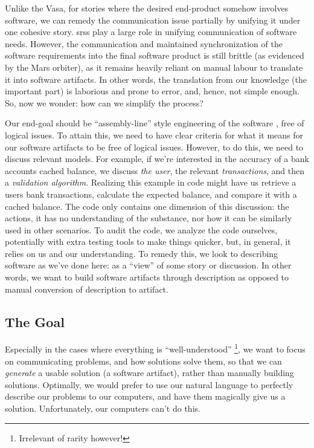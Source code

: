 Unlike the Vasa, for stories where the desired end-product somehow involves
software, we can remedy the communication issue partially by unifying it under
one cohesive story. \Aclp{srs} play a large role in unifying communication of
software needs. However, the communication and maintained synchronization of the
software requirements into the final software product is still brittle (as
evidenced by the Mars orbiter), as it remains heavily reliant on manual labour
to translate it into software artifacts. In other words, the translation from
our knowledge (the important part) is laborious and prone to error, and, hence,
not simple enough. So, now we wonder: how can we simplify the process?

Our end-goal should be ``assembly-line'' style engineering of the software
\cite{well-understood}, free of logical issues. To attain this, we need to have
clear criteria for what it means for our software artifacts to be free of
logical issues. However, to do this, we need to discuss relevant models. For
example, if we're interested in the accuracy of a bank accounts cached balance,
we discuss \textit{the user}, the relevant \textit{transactions}, and then a
\textit{validation algorithm}. Realizing this example in code might have us
retrieve a users bank transactions, calculate the expected balance, and compare
it with a cached balance. The code only contains one dimension of this
discussion: the actions, it has no understanding of the substance, nor how it
can be similarly used in other scenarios. To audit the code, we analyze the code
ourselves, potentially with extra testing tools to make things quicker, but, in
general, it relies on us and our understanding. To remedy this, we look to
describing software as we've done here: as a ``view'' of some story or
discussion. In other words, we want to build software artifacts through
description as opposed to manual conversion of description to artifact.

\subsection{The Goal}
\label{chap:ideology:sec:thoughts_of_generation:subsec:the_goal}

Especially in the cases where everything is ``well-understood''
\cite{well-understood}\footnote{Irrelevant of rarity however!}, we want to focus
on communicating problems, and how solutions solve them, so that we can
\textit{generate} a usable solution (a software artifact), rather than manually
building solutions. Optimally, we would prefer to use our natural language to
perfectly describe our problems to our computers, and have them magically give
us a solution. Unfortunately, our computers can't do this.


